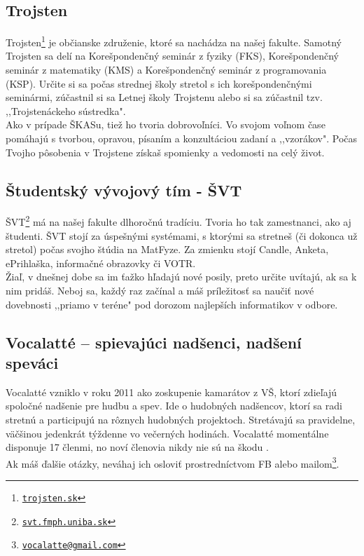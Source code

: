 \subsection{Trojsten}

Trojsten\footnote{\href{https://www.trojsten.sk}{\texttt{trojsten.sk}}} je občianske združenie, ktoré sa nachádza na našej fakulte. Samotný Trojsten sa delí na Korešpondenčný seminár z fyziky (FKS), Korešpondenčný seminár z matematiky (KMS) a Korešpondenčný seminár z programovania (KSP). Určite si sa počas strednej školy stretol s ich korešpondenčnými seminármi, zúčastnil si sa Letnej školy Trojstenu alebo si sa zúčastnil tzv. ,,Trojstenáckeho sústredka". \\

Ako v prípade ŠKASu, tiež ho tvoria dobrovoľníci. Vo svojom voľnom čase pomáhajú s tvorbou, opravou, písaním a konzultáciou zadaní a ,,vzorákov". Počas Tvojho pôsobenia v Trojstene získaš spomienky a vedomosti na celý život. \Smiley

\subsection{Študentský vývojový tím - ŠVT}

ŠVT\footnote{\href{https://svt.fmph.uniba.sk}{\texttt{svt.fmph.uniba.sk}}} má na našej fakulte dlhoročnú tradíciu. Tvoria ho tak zamestnanci, ako aj študenti. ŠVT stojí za úspešnými systémami, s ktorými sa stretneš (či dokonca už stretol) počas svojho štúdia na MatFyze. Za zmienku stojí Candle, Anketa, ePrihlaška, informačné obrazovky či VOTR. \\

Žiaľ, v dnešnej dobe sa im ťažko hľadajú nové posily, preto určite uvítajú, ak sa k nim pridáš. Neboj sa, každý raz začínal a máš príležitosť sa naučiť nové dovebnosti ,,priamo v teréne" pod dorozom najlepších informatikov v odbore. 

\subsection{Vocalatté – spievajúci nadšenci, nadšení speváci}

Vocalatté vzniklo v roku 2011 ako zoskupenie kamarátov z VŠ, ktorí zdieľajú spoločné nadšenie pre hudbu a spev. Ide o hudobných nadšencov, ktorí sa radi stretnú a participujú na rôznych hudobných projektoch. Stretávajú sa pravidelne, väčšinou jedenkrát týždenne vo večerných hodinách. Vocalatté momentálne disponuje 17 členmi, no noví členovia nikdy nie sú na škodu \Smiley. \\
Ak máš ďalšie otázky, neváhaj ich osloviť prostredníctvom FB alebo mailom\footnote{\href{mailto:vocalatte@gmail.com}{\texttt{vocalatte@gmail.com}}}.





